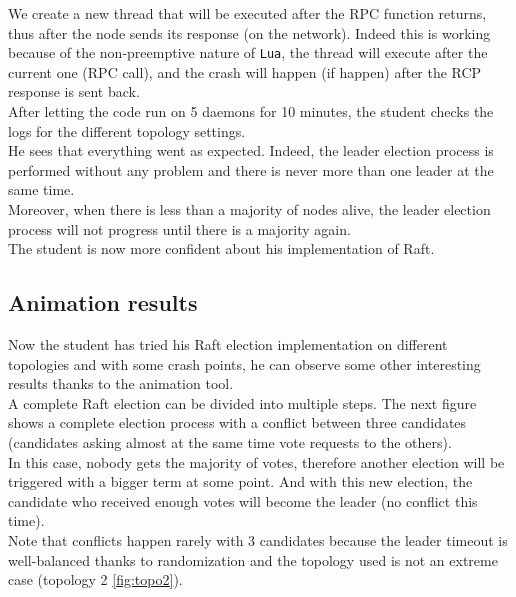 \documentclass{eplmastersthesis}
\begin{document}
        We create a new thread that will be executed after the RPC function
        returns, thus after the node sends its response (on the network). Indeed this is
        working because of the non-preemptive nature of \texttt{Lua}, the thread
        will execute after the current one (RPC call), and the crash will happen (if happen)
        after the RCP response is sent back.\\

        After letting the code run on 5 daemons for 10 minutes, the student
        checks the logs for the different topology settings.\\
        He sees that everything went as expected. Indeed, the leader
        election process is performed without any problem and there is never
        more than one leader at the same time.\\
        Moreover, when there is less than a majority of nodes alive, the leader
        election process will not progress until there is a majority again.\\
        The student is now more confident about his implementation of Raft.

      \subsection{Animation results}

        Now the student has tried his Raft election implementation on
        different topologies and with some crash points, he can observe some
        other interesting results thanks to the animation tool.\\
        A complete Raft election can be divided into multiple steps. The next
        figure shows a complete election process with a conflict between
        three candidates (candidates asking almost at the same time vote
        requests to the others).\\
        In this case, nobody gets the majority of votes, therefore another
        election will be triggered with a bigger term at some point.
        And with this new election, the candidate who received enough votes
        will become the leader (no conflict this time).\\
        Note that conflicts happen rarely with 3 candidates because the
        leader timeout is well-balanced thanks to randomization and the
        topology used is not an extreme case (topology 2 \ref{fig:topo2}).
\end{document}
